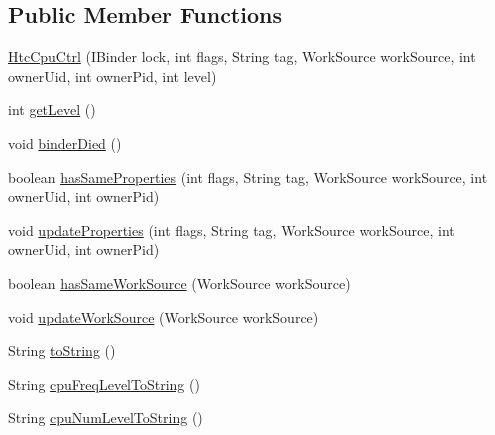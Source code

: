 \subsection*{Public Member Functions}
\begin{DoxyCompactItemize}
\item 
\hyperlink{classcom_1_1android_1_1server_1_1power_1_1PowerManagerService_1_1HtcCpuCtrl_a7bd3fe868e78e2744c6b03a40e01128c}{Htc\-Cpu\-Ctrl} (I\-Binder lock, int flags, String tag, Work\-Source work\-Source, int owner\-Uid, int owner\-Pid, int level)
\item 
int \hyperlink{classcom_1_1android_1_1server_1_1power_1_1PowerManagerService_1_1HtcCpuCtrl_ada5ade08fc1bbc694eb3fbad8238102c}{get\-Level} ()
\item 
void \hyperlink{classcom_1_1android_1_1server_1_1power_1_1PowerManagerService_1_1HtcCpuCtrl_a74f222d6908370d9129ee780050df1e9}{binder\-Died} ()
\item 
boolean \hyperlink{classcom_1_1android_1_1server_1_1power_1_1PowerManagerService_1_1HtcCpuCtrl_a7da367150c7c4506ceffbac3283ee7e9}{has\-Same\-Properties} (int flags, String tag, Work\-Source work\-Source, int owner\-Uid, int owner\-Pid)
\item 
void \hyperlink{classcom_1_1android_1_1server_1_1power_1_1PowerManagerService_1_1HtcCpuCtrl_a97aaf5d3af48928c73af170a64a869b3}{update\-Properties} (int flags, String tag, Work\-Source work\-Source, int owner\-Uid, int owner\-Pid)
\item 
boolean \hyperlink{classcom_1_1android_1_1server_1_1power_1_1PowerManagerService_1_1HtcCpuCtrl_a31b1cc24bd6f3624ad1a71eafe2fad64}{has\-Same\-Work\-Source} (Work\-Source work\-Source)
\item 
void \hyperlink{classcom_1_1android_1_1server_1_1power_1_1PowerManagerService_1_1HtcCpuCtrl_abd81472be2ab5e7eccc8c68840b3bbfa}{update\-Work\-Source} (Work\-Source work\-Source)
\item 
String \hyperlink{classcom_1_1android_1_1server_1_1power_1_1PowerManagerService_1_1HtcCpuCtrl_a2e8197ca6777001ab61ab5ce23db7907}{to\-String} ()
\item 
String \hyperlink{classcom_1_1android_1_1server_1_1power_1_1PowerManagerService_1_1HtcCpuCtrl_a71169bb582d98e91065617e46be5dd03}{cpu\-Freq\-Level\-To\-String} ()
\item 
String \hyperlink{classcom_1_1android_1_1server_1_1power_1_1PowerManagerService_1_1HtcCpuCtrl_a1e5118d0b28e0b0bc81dbb3247b9c567}{cpu\-Num\-Level\-To\-String} ()
\end{DoxyCompactItemize}
